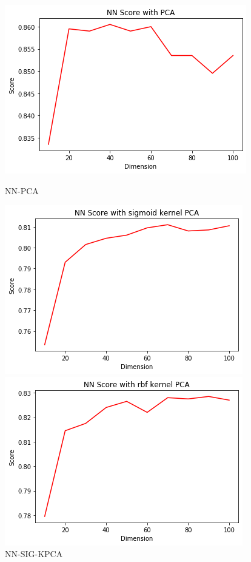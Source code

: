 \documentclass[12pt]{article}
\begin{document}
\begin{figure}[htb]
	\centering
	\begin{minipage}{.3\textwidth}
		\centering
		\includegraphics[width=\linewidth]{./exp-figs/NN-PCA.png}
		\caption{NN-PCA}
		\label{fig:NN-PCA}
	\end{minipage}%
	\begin{minipage}{0.3\textwidth}
		\centering
		\includegraphics[width=\linewidth]{./exp-figs/NN-SIG-KPCA.png}
		\caption{NN-SIG-KPCA}
		\label{fig:NN-SIG-KPCA}
	\end{minipage}
	\begin{minipage}{0.3\textwidth}
		\centering
		\includegraphics[width=\linewidth]{./exp-figs/NN-RBF-KPCA.png}

\end{minipage}
\end{figure}
\end{document}
